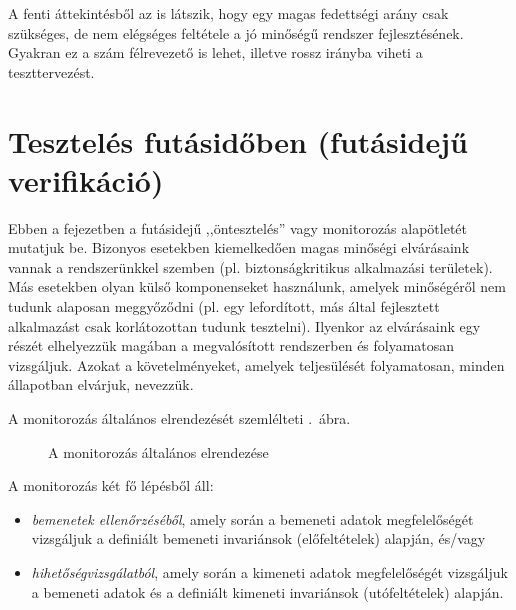 A fenti áttekintésből az is látszik, hogy egy magas fedettségi arány csak szükséges, de nem elégséges feltétele a jó minőségű rendszer fejlesztésének. Gyakran ez a szám félrevezető is lehet, illetve rossz irányba viheti a teszttervezést.


\section{Tesztelés futásidőben (futásidejű verifikáció)}\label{sec:futasideju-verifikacio}
Ebben a fejezetben a futásidejű ,,öntesztelés'' vagy monitorozás alapötletét mutatjuk be. Bizonyos esetekben kiemelkedően magas minőségi elvárásaink vannak a rendszerünkkel szemben (pl. biztonságkritikus alkalmazási területek). Más esetekben olyan külső komponenseket használunk, amelyek minőségéről nem tudunk alaposan meggyőződni (pl. egy lefordított, más által fejlesztett alkalmazást csak korlátozottan tudunk tesztelni). Ilyenkor az elvárásaink egy részét elhelyezzük magában a megvalósított rendszerben és folyamatosan vizsgáljuk. Azokat a követelményeket, amelyek teljesülését folyamatosan, minden állapotban elvárjuk,  nevezzük.

A monitorozás általános elrendezését szemlélteti .~ábra.

\begin{figure}[h]
	\centering
	

	\caption{A monitorozás általános elrendezése}
	\label{fig:monitorozas-elrendezes}
\end{figure}

A monitorozás két fő lépésből áll:
\begin{itemize}
\item \emph{bemenetek ellenőrzéséből}, amely során a bemeneti adatok megfelelőségét vizsgáljuk a definiált bemeneti invariánsok (előfeltételek) alapján, és/vagy
\item \emph{hihetőségvizsgálatból}, amely során a kimeneti adatok megfelelőségét vizsgáljuk a bemeneti adatok és a definiált kimeneti invariánsok (utófeltételek) alapján.
\end{itemize}

